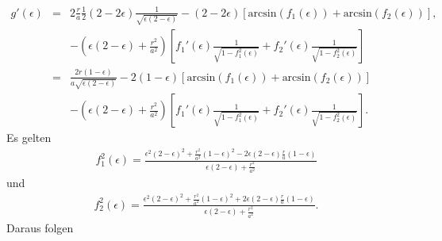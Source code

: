 \documentclass{book}
\renewcommand{\arcsin}{\text{arcsin}}
\begin{document}
%
\begin{eqnarray}
g'\left(\epsilon\right) & = & 2\frac{r}{a}\frac{1}{2}\left(2 - 2\epsilon\right)\frac{1}{\sqrt{\epsilon\left(2 - \epsilon\right)}} - \left(2 - 2\epsilon\right)\left[\arcsin\left(f_1\left(\epsilon\right)\right) + \arcsin\left(f_2\left(\epsilon\right)\right)\right], \nonumber\\
&&- \left(\epsilon\left(2 - \epsilon\right) + \frac{r^2}{a^2}\right)\left[f_1'\left(\epsilon\right)\frac{1}{\sqrt{1 - f_1^2\left(\epsilon\right)}} + f_2'\left(\epsilon\right)\frac{1}{\sqrt{1 - f_2^2\left(\epsilon\right)}}\right]\nonumber\\
& = & \frac{2r\left(1 - \epsilon\right)}{a\sqrt{\epsilon\left(2 - \epsilon\right)}} - 2\left(1 - \epsilon\right)\left[\arcsin\left(f_1\left(\epsilon\right)\right) + \arcsin\left(f_2\left(\epsilon\right)\right)\right]\nonumber\\
&&- \left(\epsilon\left(2 - \epsilon\right) + \frac{r^2}{a^2}\right)\left[f_1'\left(\epsilon\right)\frac{1}{\sqrt{1 - f_1^2\left(\epsilon\right)}} + f_2'\left(\epsilon\right)\frac{1}{\sqrt{1 - f_2^2\left(\epsilon\right)}}\right].
\end{eqnarray}
%
Es gelten
%
\begin{eqnarray}
f_1^2\left(\epsilon\right) = \frac{\epsilon^2\left(2 - \epsilon\right)^2 + \frac{r^2}{a^2}\left(1 - \epsilon\right)^2 - 2\epsilon\left(2 - \epsilon\right)\frac{r}{a}\left(1 - \epsilon\right)}{\epsilon\left(2 - \epsilon\right) + \frac{r^2}{a^2}}
\end{eqnarray}
%
und
%
\begin{eqnarray}
f_2^2\left(\epsilon\right) = \frac{\epsilon^2\left(2 - \epsilon\right)^2 + \frac{r^2}{a^2}\left(1 - \epsilon\right)^2 + 2\epsilon\left(2 - \epsilon\right)\frac{r}{a}\left(1 - \epsilon\right)}{\epsilon\left(2 - \epsilon\right) + \frac{r^2}{a^2}}.
\end{eqnarray}
%
Daraus folgen
%
\end{document}

